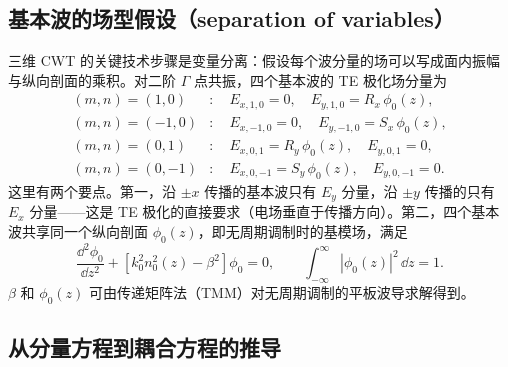 \subsection{基本波的场型假设（separation of variables）}

三维 CWT 的关键技术步骤是变量分离：假设每个波分量的场可以写成面内振幅与纵向剖面的乘积。对二阶 $\Gamma$ 点共振，四个基本波的 TE 极化场分量为 \cite{liang2012square}
\begin{align}
(m,n)=(1,0)&:\quad E_{x,1,0}=0,\quad E_{y,1,0}=R_x\,\phi_0(z),
\label{eq:3d_cwt_basic_Rx}\\
(m,n)=(-1,0)&:\quad E_{x,-1,0}=0,\quad E_{y,-1,0}=S_x\,\phi_0(z),
\label{eq:3d_cwt_basic_Sx}\\
(m,n)=(0,1)&:\quad E_{x,0,1}=R_y\,\phi_0(z),\quad E_{y,0,1}=0,
\label{eq:3d_cwt_basic_Ry}\\
(m,n)=(0,-1)&:\quad E_{x,0,-1}=S_y\,\phi_0(z),\quad E_{y,0,-1}=0.
\label{eq:3d_cwt_basic_Sy}
\end{align}
这里有两个要点。第一，沿 $\pm x$ 传播的基本波只有 $E_y$ 分量，沿 $\pm y$ 传播的只有 $E_x$ 分量——这是 TE 极化的直接要求（电场垂直于传播方向）。第二，四个基本波共享同一个纵向剖面 $\phi_0(z)$，即无周期调制时的基模场，满足
\begin{equation}
\frac{\dd^2\phi_0}{\dd z^2} + [k_0^2 n_0^2(z)-\beta^2]\phi_0 = 0,
\qquad
\int_{-\infty}^{\infty}|\phi_0(z)|^2\,\dd z = 1.
\label{eq:3d_cwt_fundamental_mode}
\end{equation}
$\beta$ 和 $\phi_0(z)$ 可由传递矩阵法（TMM）对无周期调制的平板波导求解得到。

\subsection{从分量方程到耦合方程的推导}

